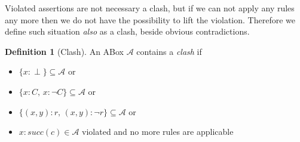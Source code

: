 \documentclass{book}
\theoremstyle{break}
\theoremstyle{definition}
\newtheorem{mydef}{Definition}
\begin{document}
Violated assertions are not necessary a clash, but if we can not apply any rules any more then we do not have the possibility to lift the violation. Therefore we define such situation \textit{also} as a clash, beside obvious contradictions.
\begin{mydef}[Clash]
An ABox $\mathcal{A}$ contains a \textit{clash} if
\begin{itemize}
\item $\{x:\perp\}\subseteq \mathcal{A}$ or
\item $\{x:C,\,x:\neg C\}\subseteq \mathcal{A}$ or
\item $\{(x,y):r,\,(x,y):\neg r\}\subseteq \mathcal{A}$ or
\item $x:succ(c)\in \mathcal{A}$ violated and no more rules are applicable
\end{itemize}
\end{mydef}
\end{document}

